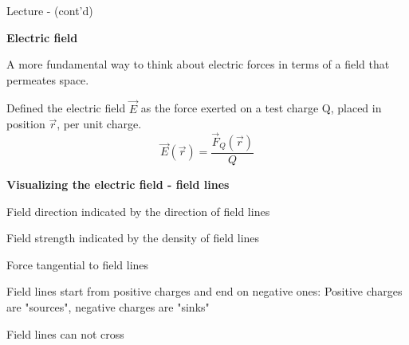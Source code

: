 \begin{frame}{Lecture \summarizedlecture - \lecturesummarytitle (cont'd)}

\begin{itemize}
{\small

\item {\bf Electric field}
  \begin{itemize}
  {\small
     \item A more fundamental way to think about electric forces in terms of a field that permeates space.
     \item Defined the electric field $\vec{E}$
           as the force exerted on a test charge Q, placed in position $\vec{r}$, per unit charge.
      \begin{equation*}
        \vec{E}(\vec{r}) = \frac{\vec{F}_Q(\vec{r})}{Q}
      \end{equation*}
  }
  \end{itemize}

\item {\bf Visualizing the electric field - field lines}
  \begin{itemize}
  {\small
     \item Field direction indicated by the direction of field lines
     \item Field strength indicated by the density of field lines
     \item Force tangential to field lines
     \item Field lines start from positive charges and end on negative ones:
           Positive charges are "sources", negative charges are "sinks"
     \item Field lines can not cross
  }
  \end{itemize}
}
\end{itemize}

\end{frame}
